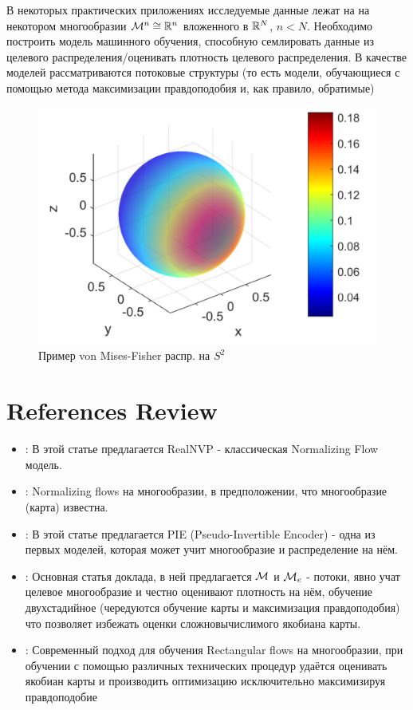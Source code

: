 В некоторых практических приложениях исследуемые данные лежат на на некотором многообразии $\mathcal{M}^n \cong \mathbb{R}^n$ вложенного в $\mathbb{R}^N$, $n < N$. Необходимо построить модель машинного обучения, способную семлировать данные из целевого распределения/оценивать плотность целевого распределения. В качестве моделей рассматриваются потоковые структуры (то есть модели, обучающиеся с помощью метода максимизации правдоподобия и, как правило, обратимые)

\begin{figure}[!h]
\vspace{-5mm}
	    \centering
	  \vspace{2mm}\includegraphics[width=0.5\linewidth]{chapters/petr_mokrov_s1/figs/VonMisesSphere.png}
	    \caption{{Пример von Mises-Fisher распр. на $S^2$}}
\end{figure}

\section{References Review}
\begin{itemize}
    \item \cite{dinh2017density} : В этой статье предлагается RealNVP - классическая Normalizing Flow модель.
    
    \item \cite{gemici2016normalizing} : Normalizing flows на многообразии, в предположении, что многообразие (карта) известна.
    
    \item \cite{beitler2019pie} : В этой статье предлагается PIE (Pseudo-Invertible Encoder) - одна из первых моделей, которая может учит многообразие и распределение на нём.
    
    \item \cite{NEURIPS2020_05192834} : Основная статья доклада, в ней предлагается $\mathcal{M}$ и $\mathcal{M}_e$ - потоки, явно учат целевое многообразие и честно оценивают плотность на нём, обучение двухстадийное (чередуются обучение карты и максимизация правдоподобия) что позволяет избежать оценки сложновычислимого якобиана карты.
    
    \item \cite{caterini2021rectangular} : Современный подход для обучения Rectangular flows на многообразии, при обучении с помощью различных технических процедур удаётся оценивать якобиан карты и производить оптимизацию исключительно максимизируя правдоподобие
\end{itemize}

